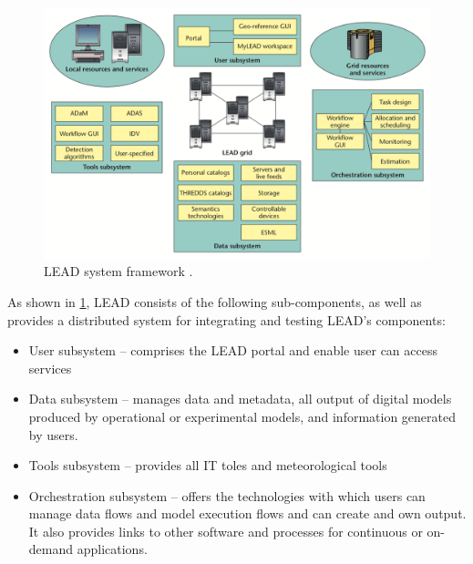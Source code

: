 \begin{figure}[htp]
    \centering
    \includegraphics[width=1.0\textwidth]{lit/lead/LEAD-system-framework-LEAD-is-composed-of-several-interacting-subsystems-with-the-LEAD_W640.png}
    \caption[LEAD system framework]{LEAD system framework \cite{Droegemeier2005Service-OrientedWeather}.}
    \label{fi:lead_framework}
\end{figure}

As shown in \cref{fi:lead_framework}, LEAD consists of the following sub-components, as well as provides a distributed system for integrating and testing LEAD's components:
\begin{itemize}
    \item User subsystem -- comprises the LEAD portal and enable user can access services
    \item Data subsystem -- manages data and metadata, all output of digital models produced by operational or experimental models, and information generated by users.
    \item Tools subsystem -- provides all IT toles and  meteorological tools
    \item Orchestration subsystem -- offers the technologies with which users can manage data flows and model execution flows and can create and own output. It also provides links to other software and processes for continuous or on-demand applications.
\end{itemize}

